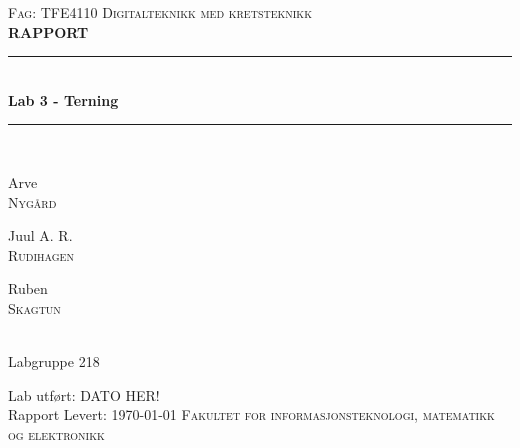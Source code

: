 \documentclass[12pt,norsk,a4paper]{article}
\newcommand{\HRule}{\rule{\linewidth}{0.5mm}}
\begin{document}
\begin{titlepage}

\begin{center}
\textsc{Fag: TFE4110 Digitalteknikk med kretsteknikk}\\[2.5cm]
\textbf{\Large RAPPORT}\\[0.5cm]


\HRule \\[0.4cm]
{ \huge \bfseries Lab 3 - Terning}\\[0.4cm]
\HRule \\[1.5cm]


\begin{minipage}{0.32\textwidth}
	\begin{center} \large
		Arve \\ 
		\textsc{Nygård}
	\end{center}
\end{minipage}
\begin{minipage}{0.32\textwidth}
	\begin{center} \large
	Juul A. R. \\
	\textsc{Rudihagen}
	\end{center}
\end{minipage}
	\begin{minipage}{0.32\textwidth}
	\begin{center} \large
	Ruben\\
	\textsc{Skagtun}
	\end{center}
\end{minipage}\\[1cm]
\large Labgruppe 218

\vfill

Lab utført: DATO HER!\\
Rapport Levert: \today
\vfill
\textsc{Fakultet for informasjonsteknologi, matematikk og elektronikk}
\end{center}
\end{titlepage}
\end{document}
